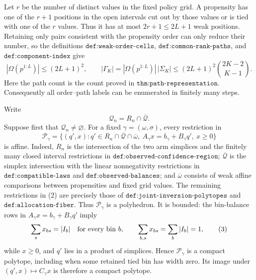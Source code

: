 Let \(r\) be the number of distinct values in the fixed policy grid.  A propensity has one of the \(r+1\) positions in the open intervals cut out by those values or is tied with one of the \(r\) values.  Thus it has at most \(2r+1\leq 2L+1\) weak positions.  Retaining only pairs consistent with the propensity order can only reduce their number, so the definitions \(\texttt{def:weak-order-cells}\), \(\texttt{def:common-rank-paths}\), and \(\texttt{def:component-index}\) give
\[
 |\Omega(p^{1:L})|\leq (2L+1)^2,
 \qquad
 |\Gamma_K|=|\Omega(p^{1:L})|\,|\Sigma_K|
 \leq (2L+1)^2\binom{2K-2}{K-1}.
 \tag{1}
\]
Here the path count is the count proved in \(\texttt{thm:path-representation}\).  Consequently all order--path labels can be enumerated in finitely many steps.

Write
\[
 \mathcal Q_n=R_n\cap\overline{\mathcal Q}.
\]
Suppose first that \(\mathcal Q_n\neq\varnothing\).  For a fixed \(\gamma=(\omega,\sigma)\), every restriction in
\[
 \mathcal P_\gamma
 =\{(q',x):q'\in R_n\cap\overline{\mathcal Q}\cap\overline\omega,
       \ A_\gamma x=b_\gamma+B_\gamma q',\ x\geq0\}
 \tag{2}
\]
is affine.  Indeed, \(R_n\) is the intersection of the two arm simplices and the finitely many closed interval restrictions in \(\texttt{def:observed-confidence-region}\); \(\overline{\mathcal Q}\) is the simplex intersection with the linear nonnegativity restrictions in \(\texttt{def:compatible-laws}\) and \(\texttt{def:observed-balances}\); and \(\overline\omega\) consists of weak affine comparisons between propensities and fixed grid values.  The remaining restrictions in (2) are precisely those of \(\texttt{def:joint-inversion-polytopes}\) and \(\texttt{def:allocation-fiber}\).  Thus \(\mathcal P_\gamma\) is a polyhedron.  It is bounded: the bin-balance rows in \(A_\gamma x=b_\gamma+B_\gamma q'\) imply
\[
 \sum_s x_{bs}=|I_b|\quad\hbox{for every bin }b,
 \qquad
 \sum_{b,s}x_{bs}=\sum_b|I_b|=1,
 \tag{3}
\]
while \(x\geq0\), and \(q'\) lies in a product of simplices.  Hence \(\mathcal P_\gamma\) is a compact polytope, including when some retained tied bin has width zero.  Its image under \((q',x)\mapsto C_\gamma x\) is therefore a compact polytope.

